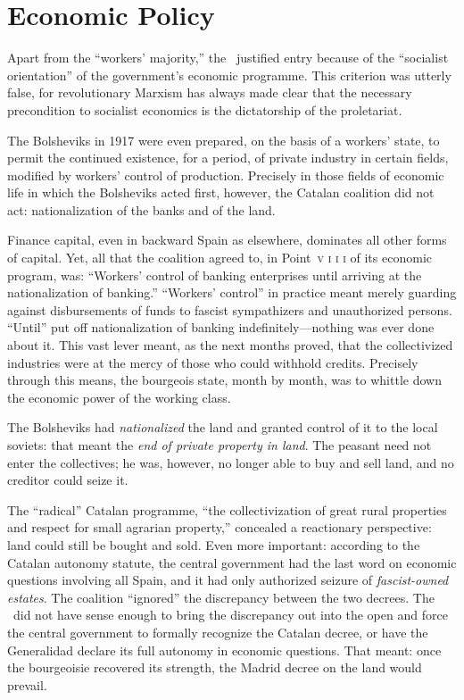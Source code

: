 \section{Economic Policy}

Apart from the ``workers’ majority,'' the \POUM\ justified entry because of the ``socialist orientation'' of the government’s economic programme. This criterion was utterly false, for revolutionary Marxism has always made clear that the necessary precondition to socialist economics is the dictatorship of the proletariat.

The Bolsheviks in 1917 were even prepared, on the basis of a workers’ state, to permit the continued existence, for a period, of private industry in certain fields, modified by workers’ control of production. Precisely in those fields of economic life in which the Bolsheviks acted first, however, the Catalan coalition did not act: nationalization of the banks and of the land.

Finance capital, even in backward Spain as elsewhere, dominates all other forms of capital. Yet, all that the coalition agreed to, in Point~\textsc{v\kern -1.5pt i\kern -1.5pt i\kern -1.5pt i} of its economic program, was: ``Workers' control of banking enterprises until arriving at the nationalization of banking.'' ``Work\-ers' control'' in practice meant merely guarding against disbursements of funds to fascist sympathizers and unauthorized persons. ``Until'' put off nationalization of banking indefinitely—nothing was ever done about it. This vast lever meant, as the next months proved, that the collectivized industries were at the mercy of those who could withhold credits. Precisely through this means, the bourgeois state, month by month, was to whittle down the economic power of the working class.

The Bolsheviks had \emph{nationalized} the land and granted control of it to the local soviets: that meant the \emph{end of private property in land}. The peasant need not enter the collectives; he was, however, no longer able to buy and sell land, and no creditor could seize it.

The ``radical'' Catalan programme, ``the collectivization of great rural properties and respect for small agrarian property,'' concealed a reactionary perspective: land could still be bought and sold. Even more important: according to the Catalan autonomy statute, the central government had the last word on economic questions involving all Spain, and it had only authorized seizure of \emph{fascist-owned estates}. The coalition ``ignored'' the discrepancy between the two decrees. The \POUM\ did not have sense enough to bring the discrepancy out into the open and force the central government to formally recognize the Catalan decree, or have the Generalidad declare its full autonomy in economic questions. That meant: once the bourgeoisie recovered its strength, the Madrid decree on the land would prevail.

